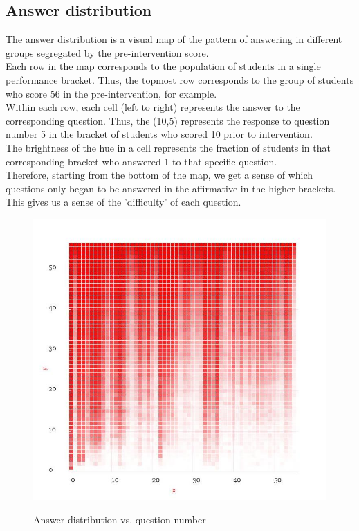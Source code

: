 \documentclass[10pt]{article}
\begin{document}
\subsection{Answer distribution}
\label{sec:AnswerDistribution}
The answer distribution is a visual map of the pattern of answering in different groups segregated by the pre-intervention score.\\
Each row in the map corresponds to the population of students in a single performance bracket. Thus, the topmost row corresponds to the group of students who score 56 in the pre-intervention, for example.\\
Within each row, each cell (left to right) represents the answer to the corresponding question. Thus, the (10,5) represents the response to question number 5 in the bracket of students who scored 10 prior to intervention.\\
The brightness of the hue in a cell represents the fraction of students in that corresponding bracket who answered 1 to that specific question.\\
Therefore, starting from the bottom of the map, we get a sense of which questions only began to be answered in the affirmative in the higher brackets. This gives us a sense of the 'difficulty' of each question.
\begin{figure}
\caption{Answer distribution vs. question number}
\label{AnswerDistribution}
\begin{center}
\includegraphics[width=120mm]{ReportMedia/AnswerDistribution.jpg}\\
\end{center}
\end{figure}
\end{document}
